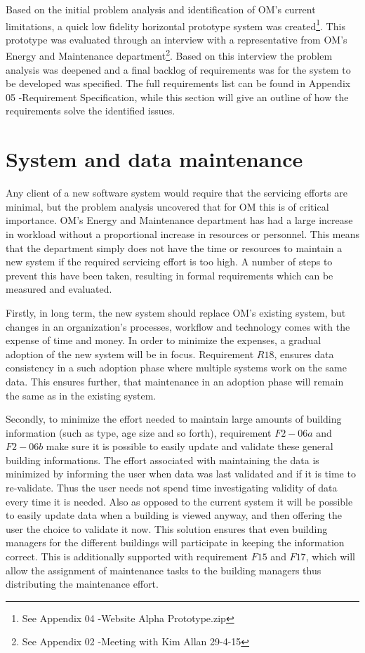 Based on the initial problem analysis and identification of OM’s current limitations, a quick low fidelity horizontal prototype system was created\footnote{See Appendix 04 -Website Alpha Prototype.zip}. This prototype was evaluated through an interview with a representative from OM’s Energy and Maintenance department\footnote{See Appendix 02 -Meeting with Kim Allan 29-4-15}. Based on this interview the problem analysis was deepened and a final backlog of requirements was for the system to be developed was specified. The full requirements list can be found in Appendix 05 -Requirement Specification, while this section will give an outline of how the requirements solve the identified issues. 
\section{System and data maintenance}
Any client of a new software system would require that the servicing efforts are minimal, but the problem analysis uncovered that for OM this is of critical importance. OM’s Energy and Maintenance department has had a large increase in workload without a proportional increase in resources or personnel. This means that the department simply does not have the time or resources to maintain a new system if the required servicing effort is too high. A number of steps to prevent this have been taken, resulting in formal requirements which can be measured and evaluated. 

Firstly, in long term, the new system should replace OM’s existing system, but changes in an organization's processes, workflow and technology comes with the expense of time and money. In order to minimize the expenses, a gradual adoption of the new system will be in focus. Requirement $R18$, ensures data consistency in a such adoption phase where multiple systems work on the same data. This ensures further, that maintenance in an adoption phase will remain the same as in the existing system.

Secondly, to minimize the effort needed to maintain large amounts of building information (such as type, age size and so forth), requirement $F2-06a$ and $F2-06b$ make sure it is possible to easily update and validate these general building informations. The effort associated with maintaining the data is minimized by informing the user when data was last validated and if it is time to re-validate. Thus the user needs not spend time investigating validity of data every time it is needed. Also as opposed to the current system it will be possible to easily update data when a building is viewed anyway, and then offering the user the choice to validate it now. This solution ensures that even building managers for the different buildings will participate in keeping the information correct. This is additionally supported with requirement $F15$ and $F17$, which will allow the assignment of maintenance tasks to the building managers thus distributing the maintenance effort.

